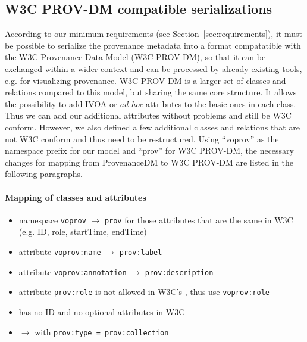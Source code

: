 \subsection{W3C PROV-DM compatible serializations}\label{sec:w3cserialization}

According to our minimum requirements (see Section~\ref{sec:requirements}), it must be possible to
serialize the provenance metadata into a format compatatible with the W3C Provenance Data Model (W3C PROV-DM), so that it can be exchanged within a wider context and can be processed by already existing tools, e.g. for visualizing provenance.
W3C PROV-DM is a larger set of classes and relations compared to this model, but sharing the same core structure. It allows the possibility to add IVOA or \textit{ad hoc} attributes to the basic ones in each class. Thus we can add our additional attributes without problems and still be W3C conform. However, we also defined a few additional classes and relations that are not W3C conform and thus need to be restructured.
Using ``voprov'' as the namespace prefix for our model and ``prov'' for W3C PROV-DM, the necessary changes for mapping from ProvenanceDM to W3C PROV-DM are listed in the following paragraphs.

\paragraph{Mapping of classes and attributes}
\begin{itemize}
\item namespace \texttt{voprov} $\rightarrow$ \texttt{prov} for those attributes that are the same in W3C (e.g. ID, role, startTime, endTime)
\item attribute \texttt{voprov:name} $\rightarrow$ \texttt{prov:label}
\item attribute \texttt{voprov:annotation} $\rightarrow$ \texttt{prov:description}
\item attribute \texttt{prov:role} is not allowed in W3C's , thus use \texttt{voprov:role}
\item {} has no ID and no optional attributes in W3C
\item {} $\rightarrow$  with \texttt{prov:type = prov:collection}
\end{itemize}

